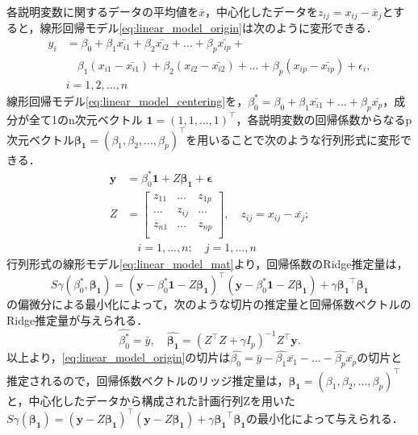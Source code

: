 \documentclass[a4paper,twocolumn]{ujarticle} %
\begin{document}
各説明変数に関するデータの平均値を$\bar{x}$，中心化したデータを$z_{ij}=x_{ij} - \bar{x}_j$とすると，線形回帰モデル\eqref{eq:linear_model_origin}は次のように変形できる．
\begin{equation}
	\begin{split}
	y_i &= \beta_0 + \beta_1 \bar{x_{i1}} + \beta_2 \bar{x_{i2}} + \dots + \beta_p \bar{x_{ip}} +	\\
	&\quad \beta_1 (x_{i1} - \bar{x_{i1}}) + \beta_2 (x_{i2} - \bar{x_{i2}}) + \dots + \beta_p (x_{ip} - \bar{x_{ip}}) + \epsilon_i, \\
	&i = 1, 2, \dots , n
	\end{split}
	\label{eq:linear_model_centering}
\end{equation}
線形回帰モデル\eqref{eq:linear_model_centering}を，$\beta_0^* = \beta_0 + \beta_1 \bar{x_{i1}} + \dots + \beta_p \bar{x_p}$，成分が全て1のn次元ベクトル $\bm 1 = (1, 1, \dots , 1)^{\top}$，各説明変数の回帰係数からなるp次元ベクトル$\bm{\beta_1} = (\beta_1, \beta_2, \dots , \beta_p)^{\top}$を用いることで次のような行列形式に変形できる．
\begin{equation}
	\begin{split}
		\bm{y} &= \beta_0^* \bm{1} + Z \bm{\beta_1} + \bm{\epsilon}\\
		Z &= \left[
                \begin{array}{ccc}
                z_{11} & \dots & z_{1p} \\
                \dots & z_{ij} & \dots \\
                z_{n1} & \dots & z_{np} \\
                \end{array}
                \right], \quad
                z_{ij} = x_{ij} - \bar{x_j};\\
                &\quad i = 1, \dots, n; \quad
                j = 1, \dots, n
	\end{split}
	\label{eq:linear_model_mat}
\end{equation}
行列形式の線形モデル\eqref{eq:linear_model_mat}より，回帰係数のRidge推定量は，
\begin{equation}
	S\gamma(\beta_0^* , \bm{\beta_1}) = (\bm{y} - \beta_0^* \bm{1} - Z \bm{\beta_1})^{\top} (\bm{y} - \beta_0^* \bm{1} - Z \bm{\beta_1}) + \gamma \bm{\beta_1}^{\top} \bm{\beta_1} 
	\label{eq:ridge_estimate}
\end{equation}
の偏微分による最小化によって，次のような切片の推定量と回帰係数ベクトルのRidge推定量が与えられる．
\begin{equation}
	\hat{\beta_0^*} = \bar{y}, \quad \hat{\bm{\beta_1}} = (Z^{\top}Z + \gamma I_p)^{-1} Z^{\top} \bm{y}.
	\label{eq:ridge_estimate_res}
\end{equation}
以上より，\eqref{eq:linear_model_origin}の切片は$\hat{\beta_0} = \bar{y} - \hat{\beta_1} \bar{x_1} - ... - \hat{\beta_p} \bar{x_p}$の切片と推定されるので，回帰係数ベクトルのリッジ推定量は，$\bm{\beta_1} = (\beta_1, \beta_2, \dots, \beta_p)^{\top}$と，中心化したデータから構成された計画行列Zを用いた$S\gamma(\bm{\beta_1}) = (\bm{y} - Z \bm{\beta_1})^{\top}  (\bm{y} - Z\bm{\beta_1}) + \gamma \bm{\beta_1}^{\top} \bm{\beta_1}$の最小化によって与えられる．
\end{document}
